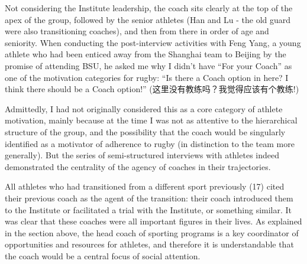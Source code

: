   Not considering the Institute leadership, the coach sits clearly at the top of the apex of the group, followed by the senior athletes (Han and Lu - the old guard were also transitioning coaches), and then from there in order of age and seniority.  When conducting the post-interview activities with Feng Yang, a young athlete who had been enticed away from the Shanghai team to Beijing by the promise of attending BSU, he asked me why I didn't have ``For your Coach'' as one of the motivation categories for rugby:  ``Is there a Coach option in here?  I think there should be a Coach option!'' (这里没有教练吗？我觉得应该有个教练!)

  Admittedly, I had not originally considered this as a core category of athlete motivation, mainly because at the time I was not as attentive to the hierarchical structure of the group, and the possibility that the coach would be singularly identified as a motivator of adherence to rugby (in distinction to the team more generally).  But the series of semi-structured interviews with athletes indeed demonstrated the centrality of the agency of coaches in their trajectories.

  All athletes who had transitioned from a different sport previously (17) cited their previous coach as the agent of the transition: their coach introduced them to the Institute or facilitated a trial with the Institute, or something similar.  It was clear that these coaches were all important figures in their lives. As explained in the section above, the head coach of sporting programs is a key coordinator of opportunities and resources for athletes, and therefore it is understandable that the coach would be a central focus of social attention.

